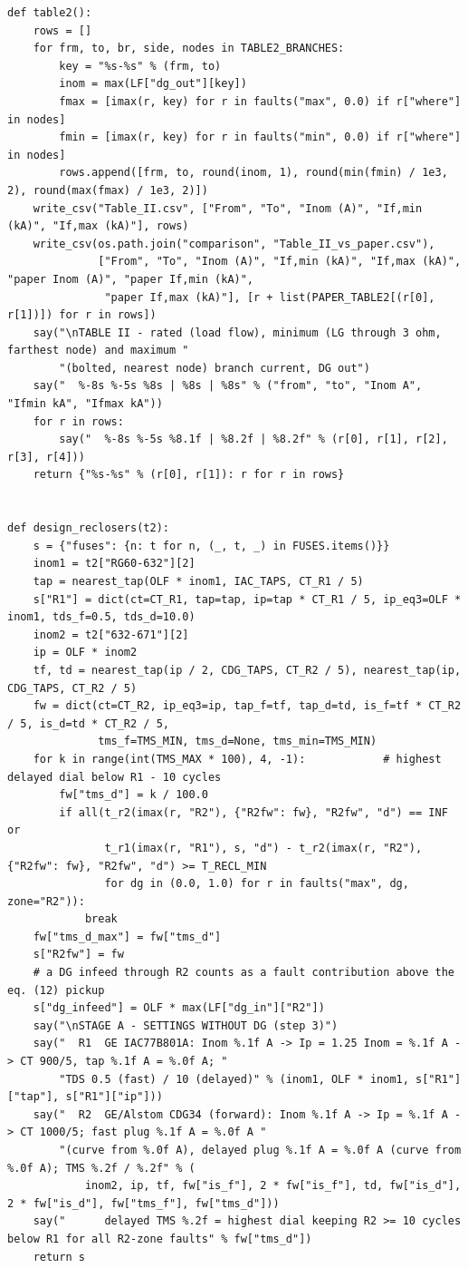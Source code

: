 \documentclass[12pt,a4paper]{article}
\begin{document}
\begin{lstlisting}
def table2():
    rows = []
    for frm, to, br, side, nodes in TABLE2_BRANCHES:
        key = "%s-%s" % (frm, to)
        inom = max(LF["dg_out"][key])
        fmax = [imax(r, key) for r in faults("max", 0.0) if r["where"] in nodes]
        fmin = [imax(r, key) for r in faults("min", 0.0) if r["where"] in nodes]
        rows.append([frm, to, round(inom, 1), round(min(fmin) / 1e3, 2), round(max(fmax) / 1e3, 2)])
    write_csv("Table_II.csv", ["From", "To", "Inom (A)", "If,min (kA)", "If,max (kA)"], rows)
    write_csv(os.path.join("comparison", "Table_II_vs_paper.csv"),
              ["From", "To", "Inom (A)", "If,min (kA)", "If,max (kA)", "paper Inom (A)", "paper If,min (kA)",
               "paper If,max (kA)"], [r + list(PAPER_TABLE2[(r[0], r[1])]) for r in rows])
    say("\nTABLE II - rated (load flow), minimum (LG through 3 ohm, farthest node) and maximum "
        "(bolted, nearest node) branch current, DG out")
    say("  %-8s %-5s %8s | %8s | %8s" % ("from", "to", "Inom A", "Ifmin kA", "Ifmax kA"))
    for r in rows:
        say("  %-8s %-5s %8.1f | %8.2f | %8.2f" % (r[0], r[1], r[2], r[3], r[4]))
    return {"%s-%s" % (r[0], r[1]): r for r in rows}


def design_reclosers(t2):
    s = {"fuses": {n: t for n, (_, t, _) in FUSES.items()}}
    inom1 = t2["RG60-632"][2]
    tap = nearest_tap(OLF * inom1, IAC_TAPS, CT_R1 / 5)
    s["R1"] = dict(ct=CT_R1, tap=tap, ip=tap * CT_R1 / 5, ip_eq3=OLF * inom1, tds_f=0.5, tds_d=10.0)
    inom2 = t2["632-671"][2]
    ip = OLF * inom2
    tf, td = nearest_tap(ip / 2, CDG_TAPS, CT_R2 / 5), nearest_tap(ip, CDG_TAPS, CT_R2 / 5)
    fw = dict(ct=CT_R2, ip_eq3=ip, tap_f=tf, tap_d=td, is_f=tf * CT_R2 / 5, is_d=td * CT_R2 / 5,
              tms_f=TMS_MIN, tms_d=None, tms_min=TMS_MIN)
    for k in range(int(TMS_MAX * 100), 4, -1):            # highest delayed dial below R1 - 10 cycles
        fw["tms_d"] = k / 100.0
        if all(t_r2(imax(r, "R2"), {"R2fw": fw}, "R2fw", "d") == INF or
               t_r1(imax(r, "R1"), s, "d") - t_r2(imax(r, "R2"), {"R2fw": fw}, "R2fw", "d") >= T_RECL_MIN
               for dg in (0.0, 1.0) for r in faults("max", dg, zone="R2")):
            break
    fw["tms_d_max"] = fw["tms_d"]
    s["R2fw"] = fw
    # a DG infeed through R2 counts as a fault contribution above the eq. (12) pickup
    s["dg_infeed"] = OLF * max(LF["dg_in"]["R2"])
    say("\nSTAGE A - SETTINGS WITHOUT DG (step 3)")
    say("  R1  GE IAC77B801A: Inom %.1f A -> Ip = 1.25 Inom = %.1f A -> CT 900/5, tap %.1f A = %.0f A; "
        "TDS 0.5 (fast) / 10 (delayed)" % (inom1, OLF * inom1, s["R1"]["tap"], s["R1"]["ip"]))
    say("  R2  GE/Alstom CDG34 (forward): Inom %.1f A -> Ip = %.1f A -> CT 1000/5; fast plug %.1f A = %.0f A "
        "(curve from %.0f A), delayed plug %.1f A = %.0f A (curve from %.0f A); TMS %.2f / %.2f" % (
            inom2, ip, tf, fw["is_f"], 2 * fw["is_f"], td, fw["is_d"], 2 * fw["is_d"], fw["tms_f"], fw["tms_d"]))
    say("      delayed TMS %.2f = highest dial keeping R2 >= 10 cycles below R1 for all R2-zone faults" % fw["tms_d"])
    return s



\end{lstlisting}
\end{document}

